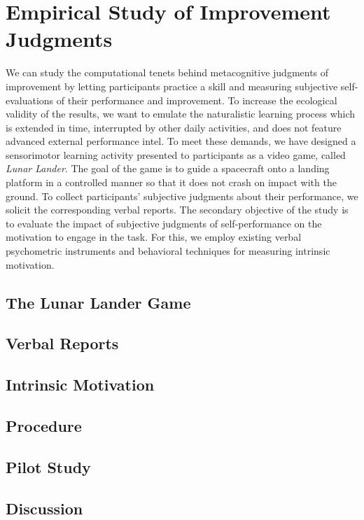 \section{Empirical Study of Improvement Judgments}
We can study the computational tenets behind metacognitive judgments of improvement by letting participants practice a skill and measuring subjective self-evaluations of their performance and improvement. To increase the ecological validity of the results, we want to emulate the naturalistic learning process which is extended in time, interrupted by other daily activities, and does not feature advanced external performance intel. To meet these demands, we have designed a sensorimotor learning activity presented to participants as a video game, called \emph{Lunar Lander}. The goal of the game is to guide a spacecraft onto a landing platform in a controlled manner so that it does not crash on impact with the ground. To collect participants' subjective judgments about their performance, we solicit the corresponding verbal reports. The secondary objective of the study is to evaluate the impact of subjective judgments of self-performance on the motivation to engage in the task. For this, we employ existing verbal psychometric instruments and behavioral techniques for measuring intrinsic motivation.

\subsection{The Lunar Lander Game}

\subsection{Verbal Reports}

\subsection{Intrinsic Motivation}

\subsection{Procedure}

\subsection{Pilot Study}

\subsection{Discussion}

